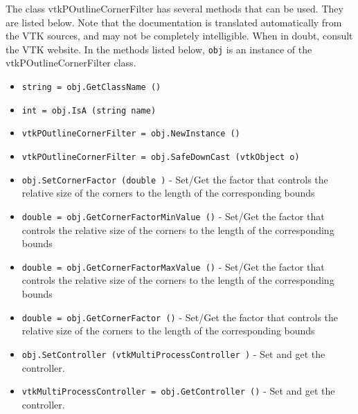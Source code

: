 The class vtkPOutlineCornerFilter has several methods that can be used.
  They are listed below.
Note that the documentation is translated automatically from the VTK sources,
and may not be completely intelligible.  When in doubt, consult the VTK website.
In the methods listed below, \verb|obj| is an instance of the vtkPOutlineCornerFilter class.
\begin{itemize}
\item  \verb|string = obj.GetClassName ()|

\item  \verb|int = obj.IsA (string name)|

\item  \verb|vtkPOutlineCornerFilter = obj.NewInstance ()|

\item  \verb|vtkPOutlineCornerFilter = obj.SafeDownCast (vtkObject o)|

\item  \verb|obj.SetCornerFactor (double )| -  Set/Get the factor that controls the relative size of the corners
 to the length of the corresponding bounds

\item  \verb|double = obj.GetCornerFactorMinValue ()| -  Set/Get the factor that controls the relative size of the corners
 to the length of the corresponding bounds

\item  \verb|double = obj.GetCornerFactorMaxValue ()| -  Set/Get the factor that controls the relative size of the corners
 to the length of the corresponding bounds

\item  \verb|double = obj.GetCornerFactor ()| -  Set/Get the factor that controls the relative size of the corners
 to the length of the corresponding bounds

\item  \verb|obj.SetController (vtkMultiProcessController )| -  Set and get the controller.

\item  \verb|vtkMultiProcessController = obj.GetController ()| -  Set and get the controller.

\end{itemize}
